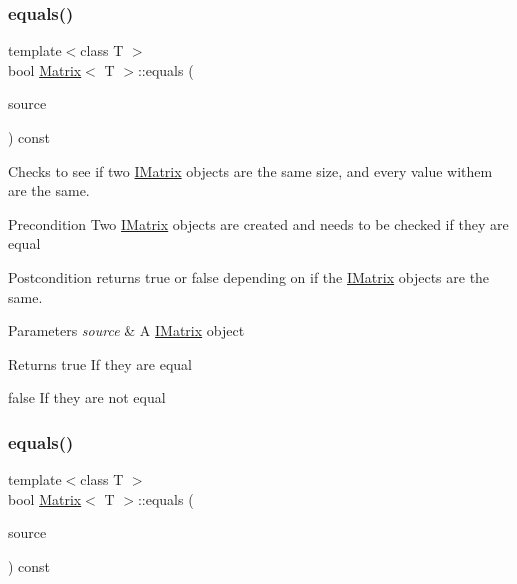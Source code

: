 \subsubsection{\texorpdfstring{equals()}{equals()}\hspace{0.1cm}{\footnotesize\ttfamily [3/6]}}
{\footnotesize\ttfamily template$<$class T $>$ \\
bool \mbox{\hyperlink{class_matrix}{Matrix}}$<$ T $>$\+::equals (\begin{DoxyParamCaption}\item[{const \mbox{\hyperlink{class_i_matrix}{I\+Matrix}}$<$ \mbox{\hyperlink{class_l_matrix}{L\+Matrix}}$<$ T $>$, T $>$ \&}]{source }\end{DoxyParamCaption}) const}



Checks to see if two \mbox{\hyperlink{class_i_matrix}{I\+Matrix}} objects are the same size, and every value withem are the same. 

\begin{DoxyPrecond}{Precondition}
Two \mbox{\hyperlink{class_i_matrix}{I\+Matrix}} objects are created and needs to be checked if they are equal 
\end{DoxyPrecond}
\begin{DoxyPostcond}{Postcondition}
returns true or false depending on if the \mbox{\hyperlink{class_i_matrix}{I\+Matrix}} objects are the same.
\end{DoxyPostcond}

\begin{DoxyParams}{Parameters}
{\em source} & A \mbox{\hyperlink{class_i_matrix}{I\+Matrix}} object \\
\hline
\end{DoxyParams}
\begin{DoxyReturn}{Returns}
true If they are equal 

false If they are not equal 
\end{DoxyReturn}
\mbox{\label{class_matrix_a1764e0965a1ed7589988834086b10444}} 
\subsubsection{\texorpdfstring{equals()}{equals()}\hspace{0.1cm}{\footnotesize\ttfamily [4/6]}}
{\footnotesize\ttfamily template$<$class T $>$ \\
bool \mbox{\hyperlink{class_matrix}{Matrix}}$<$ T $>$\+::equals (\begin{DoxyParamCaption}\item[{const \mbox{\hyperlink{class_i_matrix}{I\+Matrix}}$<$ \mbox{\hyperlink{class_u_matrix}{U\+Matrix}}$<$ T $>$, T $>$ \&}]{source }\end{DoxyParamCaption}) const}



